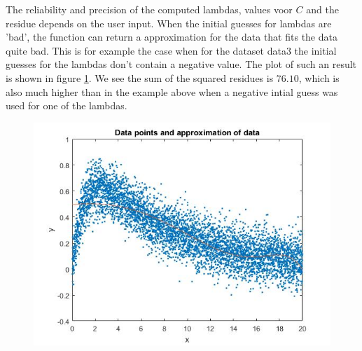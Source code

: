 \documentclass[12pt]{article}
\begin{document}
The reliability and precision of the computed lambdas, values voor $C$ and the residue depends on the user input. When the initial guesses for lambdas are 'bad', the function can return a approximation for the data that fits the data quite bad. This is for example the case when for the dataset data3 the initial guesses for the lambdas don't contain a negative value. The plot of such an result is shown in figure \ref{ex1_badplot}. We see the sum of the squared residues is $76.10$, which is also much higher than in the example above when a negative intial guess was used for one of the lambdas.
\begin{figure}[H]
\centering
\includegraphics[width=0.6\linewidth,natwidth=610,natheight=642]{ex1_badplot.jpg}
\label{ex1_badplot}
\end{figure}
\end{document}
